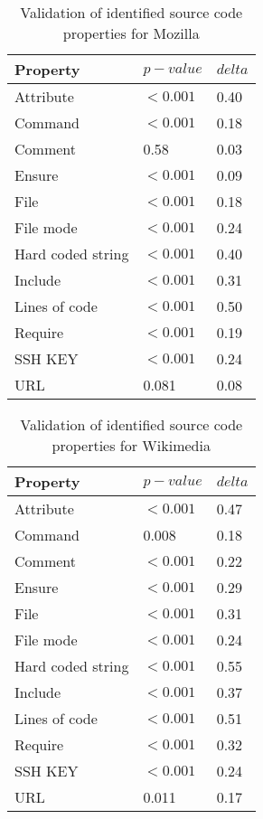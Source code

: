 \begin{table}[h]
    \caption{Validation of identified source code properties for Mozilla}
    \label{table:rq1-mozilla}
    \centering
    \begin{tabular}{|l|l|l|}
        \hline
        Property          & $p-value$ & $delta$ \\ \hline
        Attribute         & $<0.001$  & 0.40    \\ \hline
        Command           & $<0.001$  & 0.18    \\ \hline
        Comment           & 0.58      & 0.03    \\ \hline
        Ensure            & $<0.001$  & 0.09    \\ \hline
        File              & $<0.001$  & 0.18    \\ \hline
        File mode         & $<0.001$  & 0.24    \\ \hline
        Hard coded string & $<0.001$  & 0.40    \\ \hline
        Include           & $<0.001$  & 0.31    \\ \hline
        Lines of code     & $<0.001$  & 0.50    \\ \hline
        Require           & $<0.001$  & 0.19    \\ \hline
        SSH KEY           & $<0.001$  & 0.24    \\ \hline
        URL               & 0.081     & 0.08    \\ \hline
    \end{tabular}
\end{table}


\begin{table}[h]
    \caption{Validation of identified source code properties for Wikimedia}
    \label{table:rq1-wikimedia}
    \centering
    \begin{tabular}{|l|l|l|}
        \hline
        Property          & $p-value$ & $delta$ \\ \hline
        Attribute         & $<0.001$  & 0.47    \\ \hline
        Command           & 0.008     & 0.18    \\ \hline
        Comment           & $<0.001$  & 0.22    \\ \hline
        Ensure            & $<0.001$  & 0.29    \\ \hline
        File              & $<0.001$  & 0.31    \\ \hline
        File mode         & $<0.001$  & 0.24    \\ \hline
        Hard coded string & $<0.001$  & 0.55    \\ \hline
        Include           & $<0.001$  & 0.37    \\ \hline
        Lines of code     & $<0.001$  & 0.51    \\ \hline
        Require           & $<0.001$  & 0.32    \\ \hline
        SSH KEY           & $<0.001$  & 0.24    \\ \hline
        URL               & 0.011     & 0.17    \\ \hline
    \end{tabular}
\end{table}

